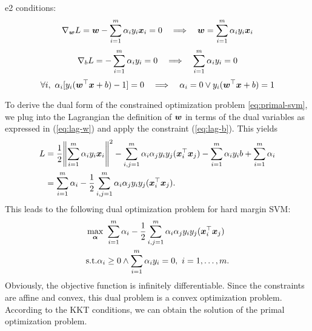 \begin{SOLUTION}{e2}
    conditions:
    \begin{equation}\label{eq:lag-w}
        \nabla_{\bm{w}} L = \bm{w} - \sum_{i=1}^m \alpha_i y_i \bm{x}_i = 0 \quad \Longrightarrow \quad \bm{w} = \sum_{i=1}^m \alpha_i y_i \bm{x}_i
    \end{equation}
    \begin{equation}\label{eq:lag-b}
        \nabla_b L = - \sum_{i=1}^m \alpha_i y_i = 0 \quad \Longrightarrow \quad \sum_{i=1}^m \alpha_i y_i = 0
    \end{equation}
    \begin{equation}\label{eq:lag-alpha}
        \forall i,~\alpha_i [y_i (\bm{w}^\top \bm{x} + b) - 1] = 0 \quad \Longrightarrow \quad \alpha_i = 0 \lor y_i (\bm{w}^\top \bm{x} + b) = 1
    \end{equation}

    To derive the dual form of the constrained optimization problem \ref{eq:primal-svm}, we plug into
    the Lagrangian the definition of \(\bm{w}\) in terms of the dual variables as expressed in (\ref{eq:lag-w}) and apply the constraint (\ref{eq:lag-b}).
    This yields
    \[
        \begin{aligned}
            L &= \frac{1}{2} \norm{\sum_{i=1}^m \alpha_i y_i \bm{x}_i}^2 - \sum_{i,j=1}^m \alpha_i \alpha_j y_i y_j (\bm{x}_i^\top \bm{x}_j) - \sum_{i=1}^m \alpha_i y_i b + \sum_{i=1}^m \alpha_i \\ 
            &= \sum_{i=1}^m \alpha_i - \frac{1}{2} \sum_{i,j=1}^{m} \alpha_i \alpha_j y_i y_j (\bm{x}_i^\top \bm{x}_j).
        \end{aligned}
    \]
    This leads to the following dual optimization problem for hard margin SVM:
    \[
        \begin{aligned}
            &\max_{\bm{\alpha}} ~ \sum_{i=1}^m \alpha_i - \frac{1}{2} \sum_{i,j=1}^{m} \alpha_i \alpha_j y_i y_j (\bm{x}_i^\top \bm{x}_j) \\
            &\text{s.t.} \alpha_i \ge 0 \land \sum_{i=1}^{m} \alpha_i y_i = 0,~i = 1, \dots, m.
        \end{aligned}  
    \]
    Obviously, the objective function is infinitely differentiable. Since the constraints are affine and convex, this dual problem is a convex optimization problem.
    According to the KKT conditions, we can obtain the solution of the primal optimization problem.
\end{SOLUTION}